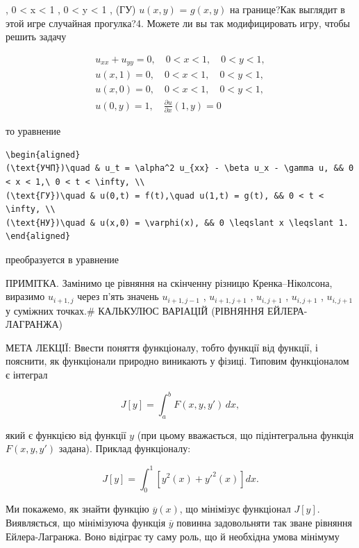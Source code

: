 \documentclass[
  ukrainian,
]{article}
\begin{document}
, 0 \textless{} x \textless{} 1 , 0 \textless{} y \textless{} 1 , (ГУ)
\(u(x, y)\) = \(g(x, y)\) на границе?Как выглядит в этой игре случайная
прогулка?4. Можете ли вы так модифицировать игру, чтобы решить задачу

\[
\begin{array}{l} u_{xx} + u_{yy} = 0, \quad 0 < x < 1, \quad 0 < y < 1, \\ u(x, 1) = 0, \quad 0 < x < 1, \quad 0 < y < 1, \\ u(x, 0) = 0, \quad 0 < x < 1, \quad 0 < y < 1, \\ u(0, y) = 1, \quad \frac{\partial u}{\partial x}(1, y) = 0 \end{array}
\]

то уравнение

\begin{verbatim}
\begin{aligned}
(\text{УЧП})\quad & u_t = \alpha^2 u_{xx} - \beta u_x - \gamma u, && 0 < x < 1,\ 0 < t < \infty, \\
(\text{ГУ})\quad & u(0,t) = f(t),\quad u(1,t) = g(t), && 0 < t < \infty, \\
(\text{НУ})\quad & u(x,0) = \varphi(x), && 0 \leqslant x \leqslant 1.
\end{aligned}
\end{verbatim}

преобразуется в уравнение

ПРИМІТКА. Замінимо це рівняння на скінченну різницю Кренка--Ніколсона,
виразимо \(u_{i+1,j}\) через п'ять значень \(u_{i+1,j-1}\) ,
\(u_{i+1,j+1}\) , \(u_{i,j+1}\) , \(u_{i,j+1}\) , \(u_{i,j+1}\) у
суміжних точках.\# КАЛЬКУЛЮС ВАРІАЦІЙ (РІВНЯННЯ ЕЙЛЕРА-ЛАГРАНЖА)

МЕТА ЛЕКЦІЇ: Ввести поняття функціоналу, тобто функції від функції, і
пояснити, як функціонали природно виникають у фізиці. Типовим
функціоналом є інтеграл

\[
J[y] = \int_a^b F(x, y, y')\,dx,
\]

який є функцією від функції \(y\) (при цьому вважається, що
підінтегральна функція \(F(x, y, y')\) задана). Приклад функціоналу:

\[
J[y] = \int_0^1 \left[y^2(x) + y'^2(x)\right] dx.
\]

Ми покажемо, як знайти функцію \(\overline{y}(x)\), що мінімізує
функціонал \(J[y]\). Виявляється, що мінімізуюча функція
\(\overline{y}\) повинна задовольняти так зване рівняння
Ейлера-Лагранжа. Воно відіграє ту саму роль, що й необхідна умова
мінімуму
\end{document}
